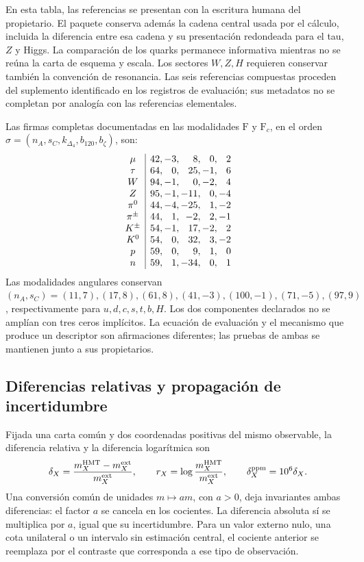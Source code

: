En esta tabla, las referencias se presentan con la escritura humana del
propietario. El paquete conserva además la cadena central usada por el
cálculo, incluida la diferencia entre esa cadena y su presentación
redondeada para el tau, \(Z\) y Higgs. La comparación de los quarks
permanece informativa mientras no se reúna la carta de esquema y escala.
Los sectores \(W,Z,H\) requieren conservar también la convención de
resonancia. Las seis referencias compuestas proceden del suplemento
identificado en los registros de evaluación; sus metadatos no se completan
por analogía con las referencias elementales.

Las firmas completas documentadas en las modalidades \(\mathrm F\) y
\(\mathrm F_c\), en el orden
\(\sigma=(n_A,s_C,k_{\Delta_4},b_{120},b_\zeta)\), son:
\[
\begin{array}{c|r@{,\,}r@{,\,}r@{,\,}r@{,\,}r}
\mu&42&-3&8&0&2\\
\tau&64&0&25&-1&6\\
W&94&-1&0&-2&4\\
Z&95&-1&-11&0&-4\\
\pi^0&44&-4&-25&1&-2\\
\pi^\pm&44&1&-2&2&-1\\
K^\pm&54&-1&17&-2&2\\
K^0&54&0&32&3&-2\\
p&59&0&9&1&0\\
n&59&1&-34&0&1
\end{array}
\]
Las modalidades angulares conservan \((n_A,s_C)=(11,7),(17,8),(61,8),
(41,-3),(100,-1),(71,-5),(97,9)\), respectivamente para
\(u,d,c,s,t,b,H\). Los dos componentes declarados no se amplían con
tres ceros implícitos. La ecuación de evaluación y el mecanismo que
produce un descriptor son afirmaciones diferentes; las pruebas de ambas
se mantienen junto a sus propietarios.

\subsection{Diferencias relativas y propagación de incertidumbre}
\label{subsec:vi-residuales}

Fijada una carta común y dos coordenadas positivas del mismo observable,
la diferencia relativa y la diferencia logarítmica son
\[
 \delta_X=\frac{m_X^{\rm HMT}-m_X^{\rm ext}}{m_X^{\rm ext}},
 \qquad r_X=\log\frac{m_X^{\rm HMT}}{m_X^{\rm ext}},
 \qquad \delta_X^{\rm ppm}=10^6\delta_X.
\]
Una conversión común de unidades \(m\mapsto am\), con \(a>0\),
deja invariantes ambas diferencias: el factor \(a\) se cancela en los
cocientes. La diferencia absoluta sí se multiplica por \(a\), igual que
su incertidumbre. Para un valor externo nulo, una cota unilateral o un
intervalo sin estimación central, el cociente anterior se reemplaza por
el contraste que corresponda a ese tipo de observación.


